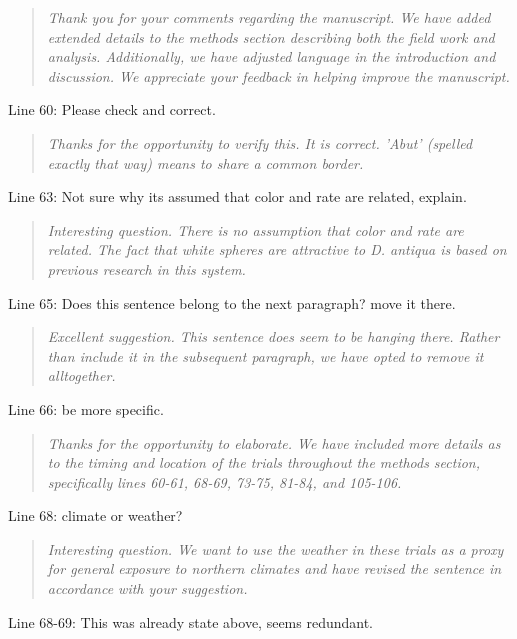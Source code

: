\documentclass{article}
\begin{document}
\begin{quote}
    \textit{Thank you for your comments regarding the manuscript.  We have added extended details to the methods section describing both the field work and analysis.  Additionally, we have adjusted language in the introduction and discussion.  We appreciate your feedback in helping improve the manuscript.  }
\end{quote}

Line 60: Please check and correct.  

\begin{quote}
    \textit{Thanks for the opportunity to verify this.  It is correct.  'Abut' (spelled exactly that way) means to share a common border. }
\end{quote}

Line 63: Not sure why its assumed that color and rate are related, explain.  

\begin{quote}
    \textit{Interesting question.  There is no assumption that color and rate are related.  The fact that white spheres are attractive to \textit{D. antiqua} is based on previous research in this system.  }
\end{quote}

Line 65: Does this sentence belong to the next paragraph? move it there.

\begin{quote}
    \textit{Excellent suggestion.  This sentence does seem to be hanging there.  Rather than include it in the subsequent paragraph, we have opted to remove it alltogether.  }
\end{quote}

Line 66: be more specific.  

\begin{quote}
    \textit{Thanks for the opportunity to elaborate.  We have included more details as to the timing and location of the trials throughout the methods section, specifically lines 60-61, 68-69, 73-75, 81-84, and 105-106. }
\end{quote}


Line 68: climate or weather?

\begin{quote}
    \textit{Interesting question.  We want to use the weather in these trials as a proxy for general exposure to northern climates and have revised the sentence in accordance with your suggestion.  }
\end{quote}


Line 68-69: This was already state above, seems redundant.
\end{document}
